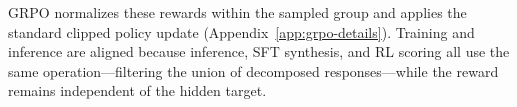 GRPO normalizes these rewards within the sampled group and applies the
standard clipped policy update (Appendix~\ref{app:grpo-details}).  Training and
inference are aligned because inference, SFT synthesis, and RL scoring all use
the same operation—filtering the union of decomposed responses—while the
reward remains independent of the hidden target.
